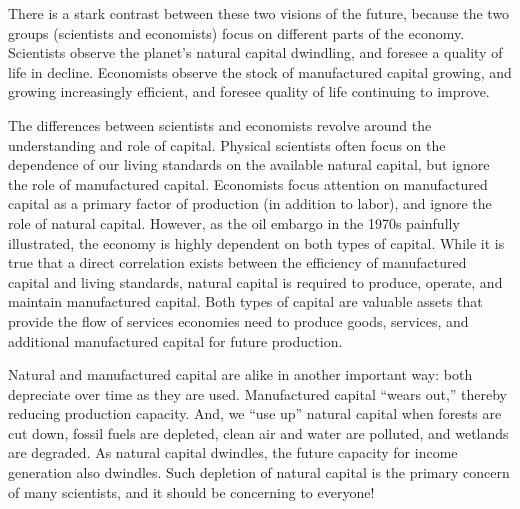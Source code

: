 There is a stark contrast between these two visions of the future, 
because the two groups (scientists and economists) focus on 
different parts of the economy.
Scientists observe the planet's natural capital dwindling, 
and foresee a quality of life in decline.
Economists observe the stock of manufactured capital growing, 
and growing increasingly efficient, 
and foresee quality of life continuing to improve. 

The differences between scientists and economists revolve around 
the understanding and role of capital.
Physical scientists often focus on the dependence of our
living standards on the available natural capital, but ignore the role of manufactured capital. 
Economists focus attention on manufactured capital 
as a primary factor of production (in addition to labor), 
and ignore the role of natural capital. 
However, as the oil embargo in the 1970s 
painfully illustrated, the economy is highly dependent on both types of capital.
While it is true that a direct correlation exists between the efficiency of manufactured capital
and living standards, natural capital is required 
to produce, operate, and maintain manufactured capital. 
Both types of capital are valuable
assets that provide the flow of services economies need to produce
goods, services, and additional manufactured capital for future production.

Natural and manufactured capital are alike in another important way:
both depreciate over time as they are used.
Manufactured capital ``wears out,'' thereby reducing production capacity. 
And, we ``use up'' natural capital when forests are cut
down, fossil fuels are depleted, clean air and water are polluted, 
and wetlands are degraded. 
As natural capital dwindles, the future
capacity for income generation also dwindles. 
Such depletion of natural capital is the primary concern of many scientists, 
and it should be concerning to everyone!


